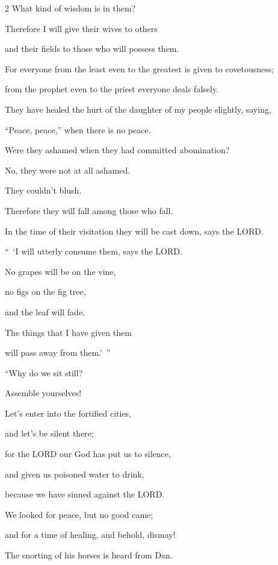 \begin{multicols}{2}
	What kind of wisdom is in them?
	
	
	\myverse{}Therefore I will give their wives to others
	
	and their fields to those who will possess them.
	
	For everyone from the least even to the greatest is given to covetousness;
	
	from the prophet even to the priest everyone deals falsely.
	
	
	\myverse{}They have healed the hurt of the daughter of my people slightly,
	saying,
	
	“Peace, peace,” when there is no peace.
	
	
	\myverse{}Were they ashamed when they had committed abomination?
	
	No, they were not at all ashamed.
	
	They couldn’t blush.
	
	Therefore they will fall among those who fall.
	
	In the time of their visitation they will be cast down, says the LORD.
	
	\vspace{\baselineskip}
	
	\myverse{}“ ‘I will utterly consume them, says the LORD.
	
	No grapes will be on the vine,
	
	no figs on the fig tree,
	
	and the leaf will fade.
	
	The things that I have given them
	
	will pass away from them.’ ”
	
	
	\vspace{\baselineskip}
	
	\myverse{}“Why do we sit still?
	
	Assemble yourselves!
	
	Let’s enter into the fortified cities,
	
	and let’s be silent there;
	
	for the LORD our God has put us to silence,
	
	and given us poisoned water to drink,
	
	because we have sinned against the LORD.
	
	
	\myverse{}We looked for peace, but no good came;
	
	and for a time of healing, and behold, dismay!
	
	
	\myverse{}The snorting of his horses is heard from Dan.
	

\end{multicols}
